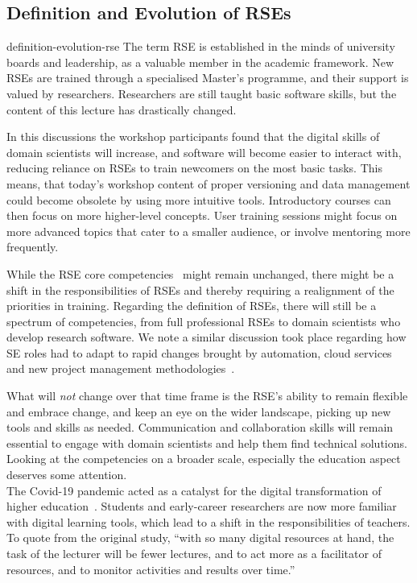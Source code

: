 \documentclass{eceasst}
\begin{document}
\subsection{Definition and Evolution of RSEs}
\begin{whatis}{}{definition-evolution-rse}
The term RSE is established in the minds of university boards and leadership, as a valuable member in the academic framework.
New RSEs are trained through a specialised Master's programme, and their support is valued by researchers.
Researchers are still taught basic software skills, but the content of this lecture has drastically changed.
\end{whatis}
In this discussions the workshop participants found that
the digital skills of domain scientists will increase,
and software will become easier to interact with,
reducing reliance on RSEs to train newcomers on the most basic tasks.
This means, that today's workshop content of proper versioning
and data management could become obsolete by using more intuitive tools.
Introductory courses can then focus on more higher-level concepts.
User training sessions might focus on more advanced topics
that cater to a smaller audience, or involve mentoring more frequently.

While the RSE core competencies~\cite{Goth2024} might remain unchanged,
there might be a shift in the responsibilities of RSEs and thereby requiring a realignment of the priorities in training.
Regarding the definition of RSEs, there will still be a spectrum of competencies,
from full professional RSEs to domain scientists who develop research software.
We note a similar discussion took place regarding how SE roles had to adapt to
rapid changes brought by automation, cloud services and new project management
methodologies~\cite{Meade2019}.

What will \emph{not} change over that time frame is the RSE's ability to remain
flexible and embrace change, and keep an eye on the wider landscape,
picking up new tools and skills as needed.
Communication and collaboration skills will remain essential to engage
with domain scientists and help them find technical solutions.\\

Looking at the competencies on a broader scale, especially the education aspect deserves some attention.\\
The Covid-19 pandemic acted as a catalyst for the digital transformation
of higher education~\cite{Bygstad2022}. Students and early-career researchers
are now more familiar with digital learning tools, which lead to a shift
in the responsibilities of teachers. To quote from the original study,
``with so many digital resources at hand,
the task of the lecturer will be fewer lectures,
and to act more as a facilitator of resources,
and to monitor activities and results over time.''~\cite{Bygstad2022}
\end{document}
